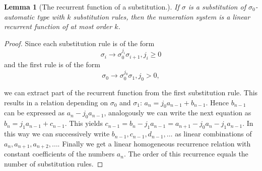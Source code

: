 \documentclass{article}
\newtheorem{lemma}[theorem]{Lemma}
\theoremstyle{definition}
\begin{document}
\begin{lemma}[The recurrent function of a substitution.]
If $\sigma$ is a substitution of $\sigma_0$-automatic type with $k$ 
substitution rules, then the numeration system is a linear recurrent function 
of at most order $k$.
\end{lemma}
\begin{proof}
Since each substitution rule is of the form 
\begin{displaymath}
\sigma_i \rightarrow \sigma_0^{j_i} \sigma_{i + 1}, j_i \ge 0
\end{displaymath}
and the first rule is of the form
\begin{displaymath}
\sigma_0 \rightarrow \sigma_0^{j_0} \sigma_1, j_0 > 0,
\end{displaymath}

we can extract part of the recurrent function from the first substitution rule.
This results in a relation depending on $\sigma_0$ and $\sigma_1$: 
$a_n = j_0 a_{n - 1} + b_{n - 1}$. Hence $b_{n - 1}$ can be expressed as  
$a_n - j_0 a_{n - 1}$, analogously we
can write the next equation as $b_n = j_1 a_{n - 1} + c_{n - 1}$. This yields
$c_{n - 1} = b_n - j_1 a_{n - 1} = a_{n + 1} - j_0 a_n - j_1 a_{n - 1}$. In 
this way we can successively write $b_{n - 1}, c_{n - 1}, d_{n - 1}, \ldots$
as linear combinations of $a_n, a_{n + 1}, a_{n + 2}, \ldots$. Finally we get
a linear homogeneous recurrence relation with constant coefficients of the
numbers $a_n$. The order of this recurrence equals the number of substitution
rules.
\end{proof}
\end{document}
